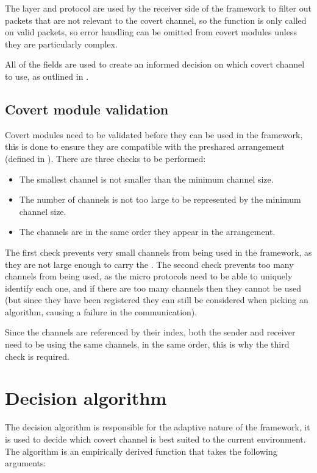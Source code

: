The layer and protocol are used by the receiver side of the framework to filter out packets that are not relevant to the covert channel, so the  function is only called on valid packets, so error handling can be omitted from covert modules unless they are particularly complex.

All of the fields are used to create an informed decision on which covert channel to use, as outlined in .

\subsection{Covert module validation}

Covert modules need to be validated before they can be used in the framework, this is done to ensure they are compatible with the preshared arrangement (defined in ). There are three checks to be performed:

\begin{itemize}
    \item The smallest channel is not smaller than the minimum channel size.
    \item The number of channels is not too large to be represented by the minimum channel size.
    \item The channels are in the same order they appear in the arrangement.
\end{itemize}

The first check prevents very small channels from being used in the framework, as they are not large enough to carry the . The second check prevents too many channels from being used, as the micro protocols need to be able to uniquely identify each one, and if there are too many channels then they cannot be used (but since they have been registered they can still be considered when picking an algorithm, causing a failure in the communication).

Since the channels are referenced by their index, both the sender and receiver need to be using the same channels, in the same order, this is why the third check is required.

\section{Decision algorithm}
\label{sec:decision_algorithm}

The decision algorithm is responsible for the adaptive nature of the framework, it is used to decide which covert channel is best suited to the current environment.
The algorithm is an empirically derived function that takes the following arguments:


